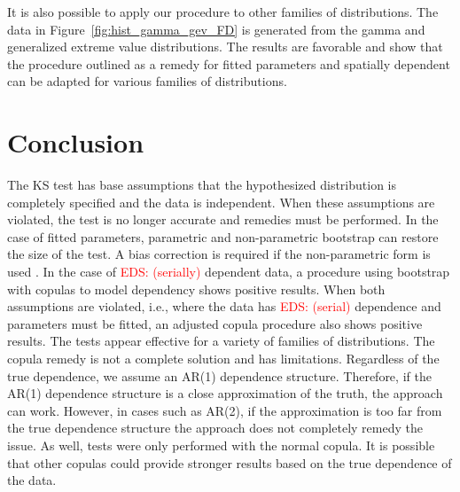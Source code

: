 \documentclass[12pt, letterpaper, titlepage]{article}
\newcommand{\eds}[1]{\textcolor{red}{EDS: (#1)}}
\begin{document}
It is also possible to apply our procedure to other families of distributions.
The data in Figure~\ref{fig:hist_gamma_gev_FD} is generated from the gamma and
generalized extreme value distributions. The results are favorable and show that
the procedure outlined as a remedy for fitted parameters and spatially dependent
can be adapted for various families of distributions.


\section{Conclusion}
\label{sec:conclusion}

The KS test has base assumptions that the hypothesized distribution is
completely specified and the data is independent. When these assumptions are
violated, the test is no longer accurate and remedies must be performed. In the
case of fitted parameters, parametric and non-parametric bootstrap can restore
the size of the test. A bias correction is required if the non-parametric form
is used \citep{babu2004goodness}. In the case of \eds{serially} dependent data, a procedure
using bootstrap
with copulas to model dependency shows positive results. When both assumptions
are violated, i.e., where the data has \eds{serial} dependence and parameters
must
be fitted, an adjusted copula procedure also shows positive results. The tests
appear effective for a variety of families of distributions. The copula remedy
is not a complete solution and has limitations. Regardless of the true
dependence, we assume an AR(1) dependence structure. Therefore, if the AR(1)
dependence structure is a close approximation of the truth, the approach can work.
However, in cases such as AR(2), if the approximation is too far from the true
dependence structure the approach does not completely remedy the issue. As well,
tests were only performed with the normal copula. It is possible that other
copulas could provide stronger results based on the true dependence of the data.



\end{document}
